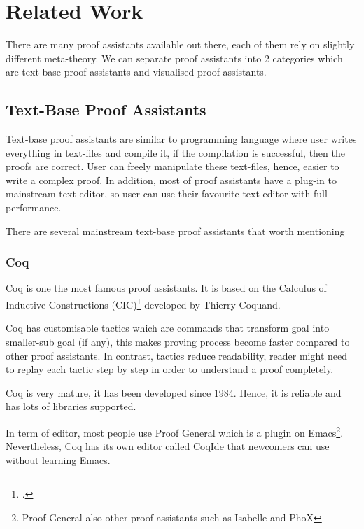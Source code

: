 \documentclass[master.tex]{subfiles}
\begin{document}
\chapter{Related Work}

There are many proof assistants available out there, each of them rely on
slightly different meta-theory. We can separate proof assistants into 2
categories which are text-base proof assistants and visualised proof assistants.

\section{Text-Base Proof Assistants}

Text-base proof assistants are similar to programming language where user writes
everything in text-files and compile it, if the compilation is successful, then
the proofs are correct. User can freely manipulate these text-files, hence,
easier to write a complex proof. In addition, most of proof assistants have a
plug-in to mainstream text editor, so user can use their favourite text editor
with full performance.

There are several mainstream text-base proof assistants that worth mentioning

\subsection{Coq}
Coq\supercite{coq-official-website} is one the most famous proof assistants. It
is based on the Calculus of Inductive Constructions (CIC)\footcite{CIC is itself
  is developed alongside Coq.} developed by Thierry
Coquand\supercite{thierry-coquand-homepage}.

Coq has customisable tactics which are commands that transform goal into
smaller-sub goal (if any), this makes proving process become faster compared to
other proof assistants. In contrast, tactics reduce readability, reader might
need to replay each tactic step by step in order to understand a proof
completely.

Coq is very mature, it has been developed since 1984. Hence, it is reliable and
has lots of libraries supported.

In term of editor, most people use Proof
General\supercite{proof-general-official-website} which is a plugin on
Emacs\footnote{Proof General also other proof assistants such as Isabelle and PhoX}.
Nevertheless, Coq has its own editor called
CoqIde\supercite{coqide-official-website} that newcomers can use without
learning Emacs.
\end{document}
